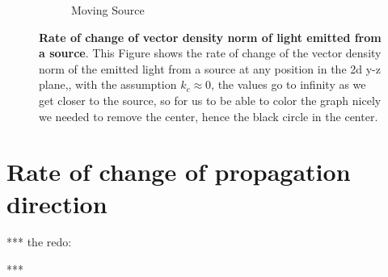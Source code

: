 \begin{figure}[H]
\begin{subfigure}{0.45\textwidth}
		\caption{Moving Source}
		\label{subfig_2: light emitted from a source's rate of change of vector density norm}
	\end{subfigure}
	\caption{\textbf{Rate of change of vector density norm of light emitted from a source}. This Figure shows the rate of change of the vector density norm of the emitted light from a source at any position in the 2d y-z plane,, with the assumption $k_c\approx 0$, the values go to infinity as we get closer to the source, so for us to be able to color the graph nicely we needed to remove the center, hence the black circle in the center.}
	\label{fig: light emitted from a source's rate of change of vector density norm}
\end{figure}

\section{Rate of change of propagation direction}\label{sect: Rate of change of propagation direction}

*** the redo:


***









